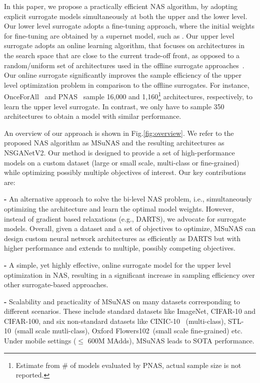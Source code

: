 \documentclass[runningheads]{llncs}
\def\ourmethod{MSuNAS}
\def\ourmodel{NSGANetV2}
\begin{document}
In this paper, we propose a practically efficient NAS algorithm, by adopting explicit surrogate models simultaneously at both the upper and the lower level. Our lower level surrogate adopts a fine-tuning approach, where the initial weights for fine-tuning are obtained by a supernet model, such as \cite{baker2017accelerating,smash,onceforall}. Our upper level surrogate adopts an online learning algorithm, that focuses on architectures in the search space that are close to the current trade-off front, as opposed to a random/uniform set of architectures used in the offline surrogate approaches~\cite{chamnet,dppnet,PNAS}. Our online surrogate significantly improves the sample efficiency of the upper level optimization problem in comparison to the offline surrogates. For instance, OnceForAll~\cite{onceforall} and PNAS~\cite{PNAS} sample 16,000 and 1,160\footnote{Estimate from \# of models evaluated by PNAS, actual sample size is not reported.} architectures, respectively, to learn the upper level surrogate. In contrast, we only have to sample 350 architectures to obtain a model with similar performance.

An overview of our approach is shown in Fig.\ref{fig:overview}. We refer to the proposed NAS algorithm as \ourmethod{} and the resulting architectures as \ourmodel{}. Our method is designed to provide a set of high-performance models on a custom dataset (large or small scale, multi-class or fine-grained) while optimizing possibly multiple objectives of interest. Our key contributions are:

\vspace{3pt}
\noindent\textbf{-} An alternative approach to solve the bi-level NAS problem, i.e., simultaneously optimizing the architecture and learn the optimal model weights. However, instead of gradient based relaxations (e.g., DARTS), we advocate for surrogate models. Overall, given a dataset and a set of objectives to optimize, \ourmethod{} can design custom neural network architectures as efficiently as DARTS but with higher performance and extends to multiple, possibly competing objectives.

\vspace{3pt}
\noindent\textbf{-} A simple, yet highly effective, online surrogate model for the upper level optimization in NAS, resulting in a significant increase in sampling efficiency over other surrogate-based approaches.

\vspace{3pt}
\noindent\textbf{-} Scalability and practicality of \ourmethod{} on many datasets corresponding to different scenarios. These include standard datasets like ImageNet, CIFAR-10 and CIFAR-100, and six non-standard datasets like CINIC-10~\cite{cinic10} (multi-class), STL-10~\cite{stl-10}(small scale mutli-class), Oxford Flowers102~\cite{flowers102}(small scale fine-grained) etc. Under mobile settings ($\leq$ 600M MAdds), \ourmethod{} leads to SOTA performance.
\end{document}
